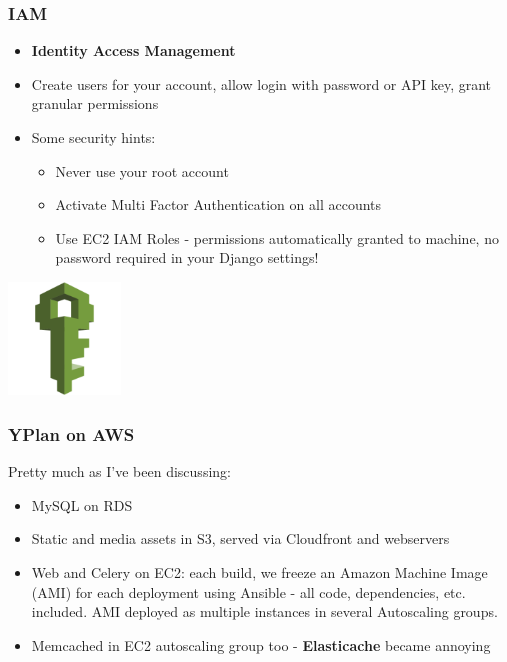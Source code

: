 \documentclass{beamer}
\begin{document}
\begin{frame}[fragile]\frametitle{IAM}

    \begin{itemize}
        \item \textbf{Identity Access Management}
        \item Create users for your account, allow login with password or API key, grant granular permissions
        \item Some security hints:
        \begin{itemize}
            \item Never use your root account
            \item Activate Multi Factor Authentication on all accounts
            \item Use EC2 IAM Roles - permissions automatically granted to machine, no password required in your Django settings!
        \end{itemize}
    \end{itemize}

    \begin{center}
        \includegraphics[width=3cm]{aws-iam}
    \end{center}

\end{frame}


\begin{frame}[fragile]\frametitle{YPlan on AWS}

    Pretty much as I've been discussing:

    \begin{itemize}
        \item MySQL on RDS
        \item Static and media assets in S3, served via Cloudfront and webservers
        \item Web and Celery on EC2: each build, we freeze an Amazon Machine Image (AMI) for each deployment using Ansible - all code, dependencies, etc. included. AMI deployed as multiple instances in several Autoscaling groups.
        \item Memcached in EC2 autoscaling group too - \textbf{Elasticache} became annoying
    \end{itemize}

\end{frame}
\end{document}
